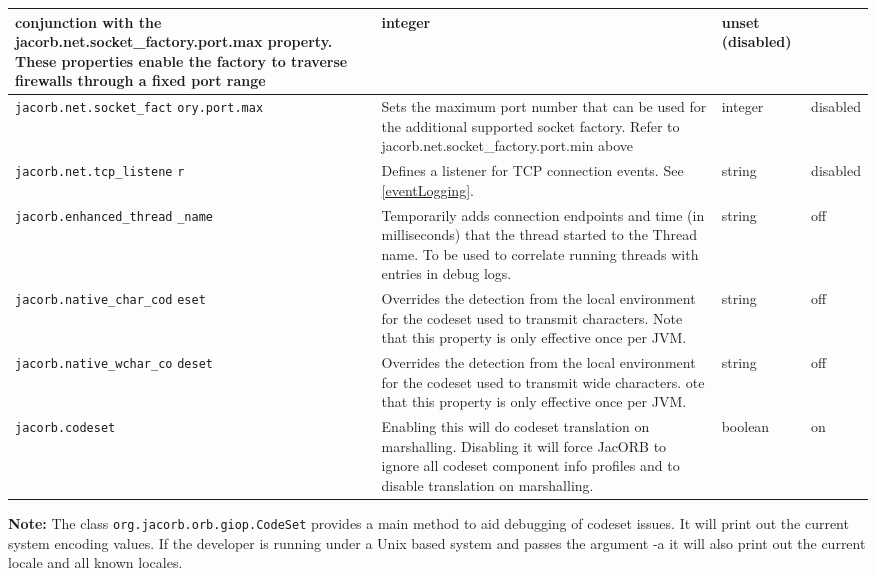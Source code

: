 {{\begin{small}
\begin{longtable}{|p{5cm}|p{7.5cm}|p{1.5cm}|p{1.5cm}|}
conjunction with the jacorb.net.socket\_factory.port.max
property. These properties enable the factory to traverse firewalls
through a fixed port range  & integer & unset (disabled) \\
\hline
\verb"jacorb.net.socket_fact"
\verb"ory.port.max" & Sets the maximum port number that can be used
for the additional supported socket factory. Refer to
jacorb.net.socket\_factory.port.min above & integer & disabled\\
\hline
\verb"jacorb.net.tcp_listene"
\verb"r" & Defines a listener for TCP connection events. See \ref{eventLogging}.
& string & disabled\\
\hline
\verb"jacorb.enhanced_thread"
\verb"_name" & Temporarily adds connection endpoints and time (in milliseconds)
that the thread started to the Thread name. To be used to correlate running
threads with entries in debug logs. & string & off\\
\hline
\verb"jacorb.native_char_cod"
\verb"eset" & Overrides the detection from the local environment for the codeset
used to transmit characters. Note that this property is only effective once per
JVM. & string & off\\
\hline
\verb"jacorb.native_wchar_co"
\verb"deset" & Overrides the detection from the local environment for the codeset
used to transmit wide characters. ote that this property is only effective once per
JVM. & string & off\\
\hline
\verb"jacorb.codeset" &
Enabling this will do codeset translation on marshalling. Disabling it will force
JacORB to ignore all codeset component info profiles and to disable translation on
marshalling. & boolean & on\\
\hline
\end{longtable}
\end{small}

\textbf{Note:} The class {\tt org.jacorb.orb.giop.CodeSet} provides a main method to
aid debugging of codeset issues. It will print out the current system encoding values.
If the developer is running under a Unix based system and passes the argument -a it will
also print out the current locale and all known locales.


}}
